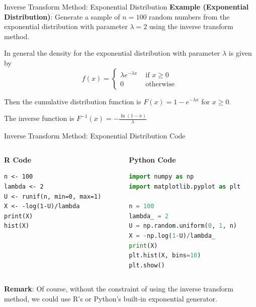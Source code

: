 \documentclass[8pt]{beamer}
\begin{document}
\begin{frame}[fragile]{Inverse Transform Method: Exponential Distribution}
\textbf{Example (Exponential Distribution)}: Generate a sample of $n=100$ random numbers from the exponential distribution with parameter $\lambda=2$ using the inverse transform method. 

\vspace{2mm}

\pause

In general the density for the exponential distribution with parameter $\lambda$ is given by
\begin{equation*}
f(x)=\left\{ 
\begin{array}{ll}
\lambda e^{-\lambda x} & \text{ if } x \geq 0  \\
0 & \text { otherwise }
\end{array}
\right.
\end{equation*}

Then the cumulative distribution function is $F(x)=1-e^{-\lambda x}$ for $x\geq 0$.

The inverse function is $\displaystyle{F^{-1}(x)=-\frac{\ln(1-x)}{\lambda}}$
\end{frame}

\begin{frame}[fragile]{Inverse Transform Method: Exponential Distribution}
\alert{Code}

\vspace{2mm}

\begin{columns}[T]

\begin{column}{0.4\textwidth}
\textbf{R Code}
\begin{lstlisting}
n <- 100
lambda <- 2
U <- runif(n, min=0, max=1)
X <- -log(1-U)/lambda
print(X)
hist(X)
\end{lstlisting}
\end{column}

\begin{column}{0.45\textwidth}
\textbf{Python Code}
\begin{lstlisting}[language=Python]
import numpy as np
import matplotlib.pyplot as plt

n = 100
lambda_ = 2
U = np.random.uniform(0, 1, n)
X = -np.log(1-U)/lambda_
print(X)
plt.hist(X, bins=10)
plt.show()
\end{lstlisting}
\end{column}
\end{columns}

\pause

\textbf{Remark}: Of course, without the constraint of using the inverse transform method, we could use R's or Python's built-in exponential generator.
\end{frame}
\end{document}
